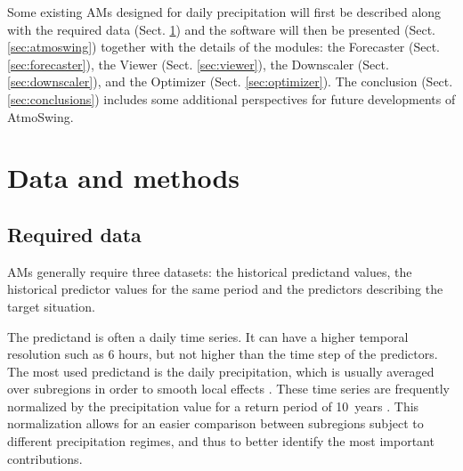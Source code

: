 \documentclass[review]{elsarticle}
\begin{document}
Some existing AMs designed for daily precipitation will first be described along with the required data (Sect. \ref{sec:data_methods}) and the software will then be presented (Sect. \ref{sec:atmoswing}) together with the details of the modules: the Forecaster (Sect. \ref{sec:forecaster}), the Viewer (Sect. \ref{sec:viewer}), the Downscaler (Sect. \ref{sec:downscaler}), and the Optimizer (Sect. \ref{sec:optimizer}). The conclusion (Sect. \ref{sec:conclusions}) includes some additional perspectives for future developments of AtmoSwing. 


\section{Data and methods}
\label{sec:data_methods}


\subsection{Required data}
\label{sec:data}

AMs generally require three datasets: the historical predictand values, the historical predictor values for the same period and the predictors describing the target situation.

The predictand is often a daily time series. It can have a higher temporal resolution such as 6 hours, but not higher than the time step of the predictors. The most used predictand is the daily precipitation, which is usually averaged over subregions in order to smooth local effects \citep{Obled2002, Marty2012}. These time series are frequently normalized by the precipitation value for a return period of 10~years \citep{Djerboua2001}. This normalization allows for an easier comparison between subregions subject to different precipitation regimes, and thus to better identify the most important contributions.
\end{document}
